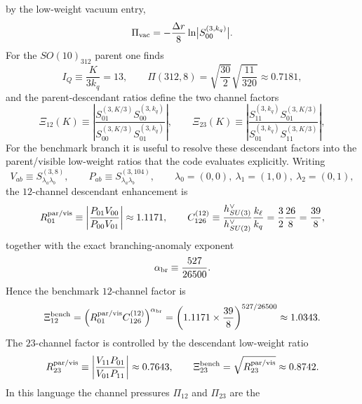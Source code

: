 \documentclass[11pt]{article}
\begin{document}
by the low-weight vacuum entry,
\begin{equation}
 \Pi_{\rm vac}
 = -\frac{\Delta r}{8}\ln\bigl|S_{00}^{(3,k_q)}\bigr|.
\end{equation}
For the $SO(10)_{312}$ parent one finds
\begin{equation}
 I_Q \equiv \frac{K}{3k_q}=13,
 \qquad
 \Pi(312,8)=\sqrt{\frac{30}{2}}\sqrt{\frac{11}{320}}\approx 0.7181,
\end{equation}
and the parent-descendant ratios define the two channel factors
\begin{equation}
 \Xi_{12}(K)
 \equiv
 \left|\frac{S_{01}^{(3,K/3)}S_{00}^{(3,k_q)}}{S_{00}^{(3,K/3)}S_{01}^{(3,k_q)}}\right|,
 \qquad
 \Xi_{23}(K)
 \equiv
 \left|\frac{S_{11}^{(3,k_q)}S_{01}^{(3,K/3)}}{S_{01}^{(3,k_q)}S_{11}^{(3,K/3)}}\right|,
\end{equation}
For the benchmark branch it is useful to resolve these descendant factors into the parent/visible low-weight ratios that the code evaluates explicitly. Writing
\begin{equation}
 V_{ab}\equiv S^{(3,8)}_{\lambda_a\lambda_b},
 \qquad
 P_{ab}\equiv S^{(3,104)}_{\lambda_a\lambda_b},
 \qquad
 \lambda_0=(0,0),\ \lambda_1=(1,0),\ \lambda_2=(0,1),
\end{equation}
the $12$-channel descendant enhancement is
\begin{equation}
 R_{01}^{\rm par/vis}
 \equiv
 \left|\frac{P_{01}V_{00}}{P_{00}V_{01}}\right|
 \approx 1.1171,
 \qquad
 C_{126}^{(12)}
 \equiv
 \frac{h^{\vee}_{SU(3)}}{h^{\vee}_{SU(2)}}\frac{k_{\ell}}{k_q}
 =
 \frac{3}{2}\frac{26}{8}
 =
 \frac{39}{8},
\end{equation}
together with the exact branching-anomaly exponent
\begin{equation}
 \alpha_{\rm br}
 \equiv
 \frac{527}{26500}.
\end{equation}
Hence the benchmark $12$-channel factor is
\begin{equation}
 \Xi_{12}^{\rm bench}
 =
 \left(R_{01}^{\rm par/vis}C_{126}^{(12)}\right)^{\alpha_{\rm br}}
 =
 \left(1.1171\times\frac{39}{8}\right)^{527/26500}
 \approx 1.0343.
\end{equation}
The $23$-channel factor is controlled by the descendant low-weight ratio
\begin{equation}
 R_{23}^{\rm par/vis}
 \equiv
 \left|\frac{V_{11}P_{01}}{V_{01}P_{11}}\right|
 \approx 0.7643,
 \qquad
 \Xi_{23}^{\rm bench}
 =
 \sqrt{R_{23}^{\rm par/vis}}
 \approx 0.8742.
\end{equation}
In this language the channel pressures $\Pi_{12}$ and $\Pi_{23}$ are the
\end{document}
